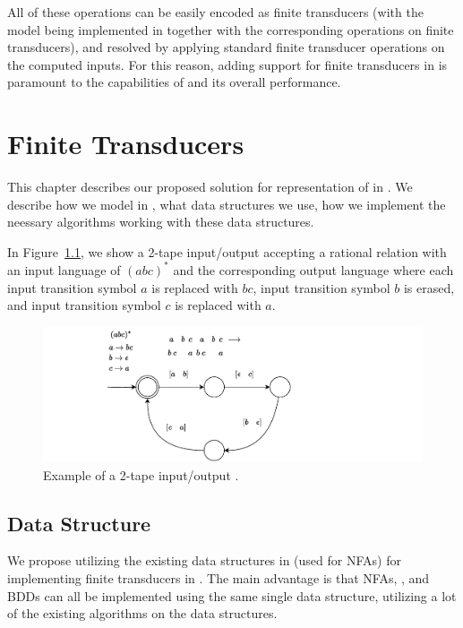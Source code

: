 All of these operations can be easily encoded as finite transducers (with the model being implemented in \mata together with the corresponding operations on finite transducers), and resolved by applying standard finite transducer operations on the computed inputs.
For this reason, adding support for finite transducers in \mata is paramount to the capabilities of \noodler and its overall performance.

\chapter{Finite Transducers}

This chapter describes our proposed solution for representation of \nfts in \mata. We describe how we model \nfts in \mata, what data structures we use, how we implement the neessary algorithms working with these data structures.

\begin{example}\label{example:2_tape_nft}
In Figure~\ref{fig:2_tape_nft}, we show a 2-tape input/output \nft accepting a rational relation with an input language of $(abc)^*$ and the corresponding output language where each input transition symbol $a$ is replaced with $bc$, input transition symbol $b$ is erased, and input transition symbol $c$ is replaced with $a$.

\begin{figure}[!ht]
  \centering
  \includegraphics[scale=1.0, keepaspectratio]{obrazky-figures/transducer.drawio.pdf}
  \caption{
    Example of a 2-tape input/output \nft.
  }\label{fig:2_tape_nft}
\end{figure}

\end{example}

\section{Data Structure}
We propose utilizing the existing data structures in \mata (used for NFAs) for implementing finite transducers in \mata.
The main advantage is that NFAs, \nfts, and BDDs can all be implemented using the same single data structure, utilizing a lot of the existing algorithms on the data structures.

